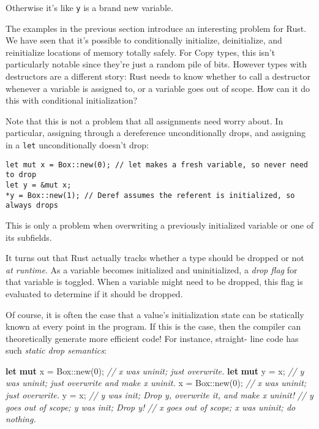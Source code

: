 \documentclass[a4paper,]{book}
\newenvironment{Shaded}{\begin{snugshade}}{\end{snugshade}}
\newcommand{\KeywordTok}[1]{\textcolor[rgb]{0.13,0.29,0.53}{\textbf{{#1}}}}
\newcommand{\DataTypeTok}[1]{\textcolor[rgb]{0.13,0.29,0.53}{{#1}}}
\newcommand{\DecValTok}[1]{\textcolor[rgb]{0.00,0.00,0.81}{{#1}}}
\newcommand{\CommentTok}[1]{\textcolor[rgb]{0.56,0.35,0.01}{\textit{{#1}}}}
\newcommand{\NormalTok}[1]{{#1}}
\begin{document}
Otherwise it's like \texttt{y} is a brand new variable.


The examples in the previous section introduce an interesting problem
for Rust. We have seen that it's possible to conditionally initialize,
deinitialize, and reinitialize locations of memory totally safely. For
Copy types, this isn't particularly notable since they're just a random
pile of bits. However types with destructors are a different story: Rust
needs to know whether to call a destructor whenever a variable is
assigned to, or a variable goes out of scope. How can it do this with
conditional initialization?

Note that this is not a problem that all assignments need worry about.
In particular, assigning through a dereference unconditionally drops,
and assigning in a \texttt{let} unconditionally doesn't drop:

\begin{verbatim}
let mut x = Box::new(0); // let makes a fresh variable, so never need to drop
let y = &mut x;
*y = Box::new(1); // Deref assumes the referent is initialized, so always drops
\end{verbatim}

This is only a problem when overwriting a previously initialized
variable or one of its subfields.

It turns out that Rust actually tracks whether a type should be dropped
or not \emph{at runtime}. As a variable becomes initialized and
uninitialized, a \emph{drop flag} for that variable is toggled. When a
variable might need to be dropped, this flag is evaluated to determine
if it should be dropped.

Of course, it is often the case that a value's initialization state can
be statically known at every point in the program. If this is the case,
then the compiler can theoretically generate more efficient code! For
instance, straight- line code has such \emph{static drop semantics}:

\begin{Shaded}
\begin{Highlighting}[]
\KeywordTok{let} \KeywordTok{mut} \NormalTok{x = }\DataTypeTok{Box}\NormalTok{::new(}\DecValTok{0}\NormalTok{); }\CommentTok{// x was uninit; just overwrite.}
\KeywordTok{let} \KeywordTok{mut} \NormalTok{y = x;           }\CommentTok{// y was uninit; just overwrite and make x uninit.}
\NormalTok{x = }\DataTypeTok{Box}\NormalTok{::new(}\DecValTok{0}\NormalTok{);         }\CommentTok{// x was uninit; just overwrite.}
\NormalTok{y = x;                   }\CommentTok{// y was init; Drop y, overwrite it, and make x uninit!}
                         \CommentTok{// y goes out of scope; y was init; Drop y!}
                         \CommentTok{// x goes out of scope; x was uninit; do nothing.}
\end{Highlighting}
\end{Shaded}
\end{document}
